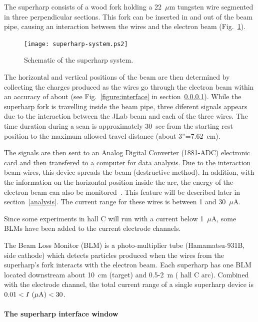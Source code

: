 The superharp consists of a wood fork holding a 22~$\mu$m tungsten wire segmented in three
perpendicular sections. This fork can be inserted in and out of the beam pipe, causing an
interaction between the wires and the electron beam (Fig.~\ref{figure:superharp}).


\begin{figure}[!hbt]
\begin{center}
\texttt{[image: superharp-system.ps2]}
\caption{Schematic of the superharp system.}
\label{figure:superharp}
\end{center}
\end{figure}

The horizontal and vertical positions of the beam are then determined by collecting the charges
produced as the wires go through the electron beam within an accuracy of about 
(see Fig.~\ref{figure:interface} in section~\ref{interface}). While the superharp fork
is travelling inside the beam pipe, three diferent signals appears due to the interaction
between the JLab beam and each of the three wires. The time duration during a scan is
approximately 30~sec from the starting rest position to the maximum allowed travel distance
(about 3''=7.62~cm).

The signals are then sent to an Analog Digital Converter (1881-ADC) electronic card and then transfered
to a computer for data analysis. Due to the interaction beam-wires, this device spreads the beam
(destructive method). In addition, with the information on the horizontal position inside the arc, the
energy of the electron beam can also be monitored~\cite{Gueye-98-energy}. This feature will be described
later in section~\ref{analysis}. The current range for these wires is
between 1 and 30~$\mu$A.  

Since some experiments in hall C will run with a current below
1~$\mu$A,  some BLMs have been added to the
current electrode channels.

The Beam Loss Monitor (BLM) is a photo-multiplier tube (Hamamatsu-931B, side cathode) which detects
particles produced when the wires from the superharp's fork interacts
with the  electron beam. Each
superharp has one BLM located downstream about 10~cm (target) and
0.5-2~m ( hall C arc). Combined with
the electrode channel, the total current range of a single superharp device is
$0.01 < I~(\mu {\rm A}) < 30$.

\paragraph{The superharp interface window}\label{interface}

